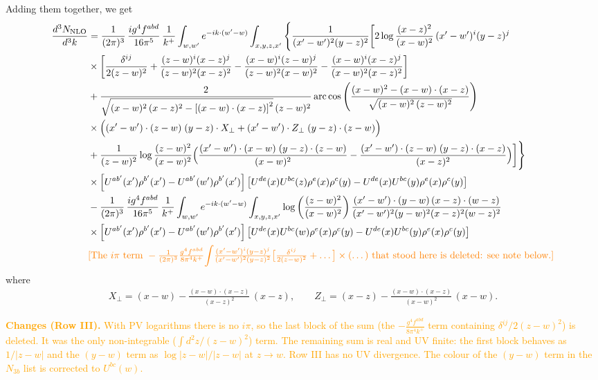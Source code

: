 \documentclass[9pt]{article}
\numberwithin{equation}{section}
\begin{document}
Adding them together, we get
\begin{align}
\frac{d^{3}N_{\rm NLO}}{d^{3}k} &=\frac{1}{(2\pi)^{3}}\,\frac{ig^{4}f^{abd}}{16\pi^{5}}\,\frac{1}{k^{+}}\int_{w,w'}e^{-ik\cdot(w'-w)}\int_{x,y,z,x'}\Bigg\{\frac{1}{(x'-w')^{2}(y-z)^{2}}\bigg[2\log\frac{(x-z)^{2}}{(x-w)^{2}}\,(x'-w')^{i}(y-z)^{j}\notag \\
& \times\bigg[\frac{\delta^{ij}}{2(z-w)^{2}}+\frac{(z-w)^{i}(x-z)^{j}}{(z-w)^{2}(x-z)^{2}}-\frac{(x-w)^{i}(z-w)^{j}}{(z-w)^{2}(x-w)^{2}}-\frac{(x-w)^{i}(x-z)^{j}}{(x-w)^{2}(x-z)^{2}}\bigg]\notag \\
& +\frac{2}{\sqrt{(x-w)^{2}\,(x-z)^{2}-\left[(x-w)\cdot (x-z)\right]^{2}}\,(z-w)^{2}}\,\mathrm{arc\,cos}\left(\frac{(x-w)^{2}-(x-w)\cdot (x-z)}{\sqrt{(x-w)^{2}\,(z-w)^{2}}}\right)\notag \\
& \times\Big((x'-w')\cdot(z-w)\;(y-z)\cdot X_{\perp}+(x'-w')\cdot Z_{\perp}\;(y-z)\cdot(z-w)\Big)\notag\\
&+\frac{1}{(z-w)^{2}}\log\frac{(z-w)^{2}}{(x-w)^{2}}\Big(\frac{(x'-w')\cdot(x-w)\;(y-z)\cdot(z-w)}{(x-w)^{2}}-\frac{(x'-w')\cdot(z-w)\;(y-z)\cdot(x-z)}{(x-z)^{2}}\Big)\bigg]\Bigg\}\notag\\
&\times\left[U^{ab'}(x')\rho^{b'}(x')-U^{ab'}(w')\rho^{b'}(x')\right]\left[U^{de}(x)U^{bc}(z)\rho^{e}(x)\rho^{c}(y)-U^{de}(x)U^{bc}(y)\rho^{e}(x)\rho^{c}(y)\right]\notag\\
&-\frac{1}{(2\pi)^{3}}\,\frac{ig^{4}f^{abd}}{16\pi^{5}}\,\frac{1}{k^{+}}\int_{w,w'}e^{-ik\cdot(w'-w)}\int_{x,y,z,x'}\log\left(\frac{(z-w)^{2}}{(x-w)^{2}}\right)\frac{(x'-w')\cdot(y-w)\,(x-z)\cdot(w-z)}{(x'-w')^{2}(y-w)^{2}(x-z)^{2}(w-z)^{2}}\notag\\
&\times\left[U^{ab'}(x')\rho^{b'}(x')-U^{ab'}(w')\rho^{b'}(x')\right]\left[U^{de}(x)U^{bc}(w)\rho^{e}(x)\rho^{c}(y)-U^{de}(x)U^{bc}(y)\rho^{e}(x)\rho^{c}(y)\right]\notag \\
&\textcolor{orange}{\text{[The }i\pi\text{ term }-\tfrac{1}{(2\pi)^{3}}\tfrac{g^{4}f^{abd}}{8\pi^{4}k^{+}}\!\int\!\tfrac{(x'-w')^{i}(y-z)^{j}}{(x'-w')^{2}(y-z)^{2}}\big[\tfrac{\delta^{ij}}{2(z-w)^{2}}+\dots\big]\times(\dots)\text{ that stood here is deleted: see note below.]}}
\end{align}
where
\begin{align}
X_{\perp}=(x-w)-\frac{(x-w)\cdot(x-z)}{(x-z)^{2}}\,(x-z),\qquad
Z_{\perp}=(x-z)-\frac{(x-w)\cdot(x-z)}{(x-w)^{2}}\,(x-w).
\end{align}

\noindent\textcolor{orange}{\textbf{Changes (Row III).} With PV logarithms there is no $i\pi$, so the last block of the sum (the $-\frac{g^{4}f^{abd}}{8\pi^{4}k^{+}}$ term containing $\delta^{ij}/2(z-w)^{2}$) is deleted. It was the only non-integrable ($\int d^{2}z/(z-w)^{2}$) term. The remaining sum is real and UV finite: the first block behaves as $1/|z-w|$ and the $(y-w)$ term as $\log|z-w|/|z-w|$ at $z\to w$. Row III has no UV divergence. The colour of the $(y-w)$ term in the $N_{3b}$ list is corrected to $U^{bc}(w)$.}
\end{document}
